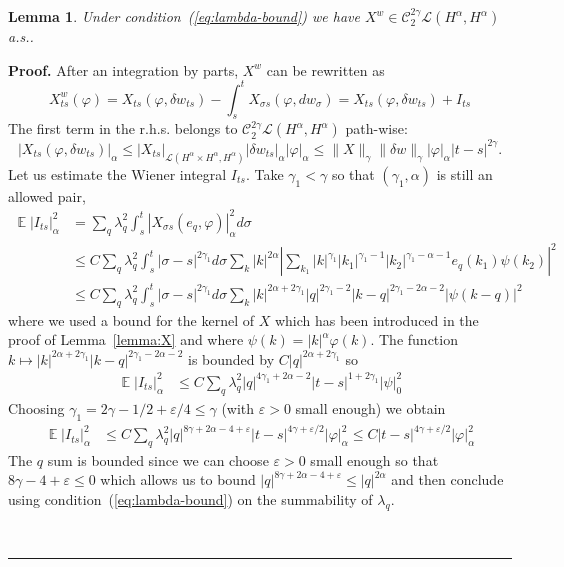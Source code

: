\documentclass[a4paper,12pt,reqno]{article}
\DeclareMathOperator{\expect}{{\mathbb E}}
\newcommand{\eps}{\varepsilon}
\newcommand{\der}{\delta}
\newcommand{\CC}{\mathcal{C}}
\newcommand{\LL}{\mathcal{L}}
\newtheorem{lemma}[theorem]{Lemma}
\newenvironment{proof}[1][Proof]{\textbf{#1.} }{\ \rule{0.5em}{0.5em}}
\begin{document}
\begin{lemma}
\label{lemma:Xw}
Under condition~(\ref{eq:lambda-bound})
we have $X^w \in \CC^{2\gamma}_2 \LL(H^\alpha,H^\alpha)$ a.s..
\end{lemma}
\begin{proof}
After an integration by parts, $X^w$ can be rewritten as
\begin{equation}
  \label{eq:Xw-2}
  X^w_{ts}(\varphi) = X_{ts}(\varphi,\der w_{ts}) - \int_s^t X_{\sigma
  s}(\varphi,dw_\sigma) = X_{ts}(\varphi,\der w_{ts}) + I_{ts} 
\end{equation}
The first term in the r.h.s. belongs to $\CC_2^{2\gamma}
\LL(H^\alpha,H^\alpha)$ path-wise:
$$
|X_{ts}(\varphi,\der w_{ts})|_{\alpha} \le
|X_{ts}|_{\LL(H^\alpha\times H^\alpha,H^\alpha)} |\der w_{ts}|_\alpha
|\varphi|_\alpha \le 
\|X\|_\gamma \|\der
w\|_\gamma |\varphi|_\alpha |t-s|^{2\gamma}.
$$
Let us estimate the Wiener integral $I_{ts}$. Take $\gamma_1 < \gamma$ so that $(\gamma_1,\alpha)$ is still an allowed pair,
\begin{equation*}
  \begin{split}
\expect \left|I_{ts}\right|^2_\alpha & = 
\sum_q \lambda_q^2 \int_s^t |X_{\sigma s}(e_q,\varphi)|_\alpha^2
d\sigma
\\ & \le C \sum_q \lambda_q^2 \int_s^t |\sigma-s|^{2\gamma_1} d\sigma \sum_k
|k|^{2\alpha}
\left|\sum_{k_1} |k|^{\gamma_1} |k_1|^{\gamma_1-1} |k_2|^{\gamma_1-\alpha-1}
  e_q(k_1) \psi(k_2)\right|^2    
\\ & \le C \sum_q \lambda_q^2 \int_s^t |\sigma-s|^{2\gamma_1} d\sigma \sum_k
|k|^{2\alpha+2\gamma_1} |q|^{2\gamma_1-2} |k-q|^{2\gamma_1-2\alpha-2}
  |\psi(k-q)|^2    
  \end{split}
\end{equation*}
where we used a bound for the kernel of $X$ which has been introduced
in the proof of Lemma~\ref{lemma:X} and where $\psi(k) =
|k|^{\alpha}\varphi(k)$. 
The function $k \mapsto
|k|^{2\alpha+2\gamma_1} |k-q|^{2\gamma_1-2\alpha-2}$ is bounded by $C
|q|^{2\alpha+2\gamma_1}$ so 
\begin{equation*}
  \begin{split}
\expect \left|I_{ts}\right|^2_\alpha &  \le C \sum_q \lambda_q^2  |q|^{4\gamma_1+2\alpha-2} 
|t-s|^{1+2\gamma_1} |\psi|_0^2
  \end{split}
\end{equation*}
Choosing $\gamma_1 = 2\gamma-1/2+\eps/4\le \gamma$ (with $\eps>0$ small enough) we obtain
\begin{equation*}
  \begin{split}
\expect \left|I_{ts}\right|^2_\alpha &  \le C \sum_q \lambda_q^2  |q|^{8\gamma+2\alpha-4+\eps} 
|t-s|^{4\gamma+\eps/2} |\varphi|_\alpha^2  \le C |t-s|^{4\gamma+\eps/2} |\varphi|_\alpha^2
  \end{split}
\end{equation*}
The $q$ sum is bounded
since we can choose $\eps>0$ small enough so that $8\gamma-4+\eps \le
0$ which allows us to bound $|q|^{8\gamma+2\alpha-4+\eps}  \le
|q|^{2\alpha}$ and then conclude using
condition~(\ref{eq:lambda-bound}) on the summability of $\lambda_q$.


\end{proof}
\end{document}
